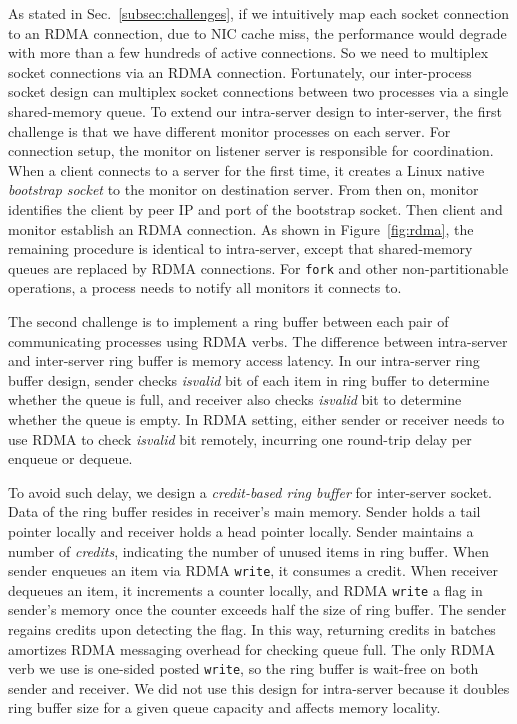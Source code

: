 As stated in Sec.~\ref{subsec:challenges}, if we intuitively map each socket connection to an RDMA connection, due to NIC cache miss, the performance would degrade with more than a few hundreds of active connections. So we need to multiplex socket connections via an RDMA connection. %
Fortunately, our inter-process socket design can multiplex socket connections between two processes via a single shared-memory queue. %
To extend our intra-server design to inter-server, the first challenge is that we have different monitor processes on each server. For connection setup, the monitor on listener server is responsible for coordination. When a client connects to a server for the first time, it creates a Linux native \textit{bootstrap socket} to the monitor on destination server. From then on, monitor identifies the client by peer IP and port of the bootstrap socket. Then client and monitor establish an RDMA connection. As shown in Figure~\ref{fig:rdma}, the remaining procedure is identical to intra-server, except that shared-memory queues are replaced by RDMA connections. For \texttt{fork} and other non-partitionable operations, a process needs to notify all monitors it connects to.

The second challenge is to implement a ring buffer between each pair of communicating processes using RDMA verbs. The difference between intra-server and inter-server ring buffer is memory access latency. In our intra-server ring buffer design, sender checks \textit{isvalid} bit of each item in ring buffer to determine whether the queue is full, and receiver also checks \textit{isvalid} bit to determine whether the queue is empty. In RDMA setting, either sender or receiver needs to use RDMA to check \textit{isvalid} bit remotely, incurring one round-trip delay per enqueue or dequeue.

To avoid such delay, we design a \textit{credit-based ring buffer} for inter-server socket. Data of the ring buffer resides in receiver's main memory. Sender holds a tail pointer locally and receiver holds a head pointer locally. Sender maintains a number of \textit{credits}, indicating the number of unused items in ring buffer. When sender enqueues an item via RDMA \texttt{write}, it consumes a credit. When receiver dequeues an item, it increments a counter locally, and RDMA \texttt{write} a flag in sender's memory once the counter exceeds half the size of ring buffer. The sender regains credits upon detecting the flag. In this way, returning credits in batches amortizes RDMA messaging overhead for checking queue full. The only RDMA verb we use is one-sided posted \texttt{write}, so the ring buffer is wait-free on both sender and receiver. We did not use this design for intra-server because it doubles ring buffer size for a given queue capacity and affects memory locality.

